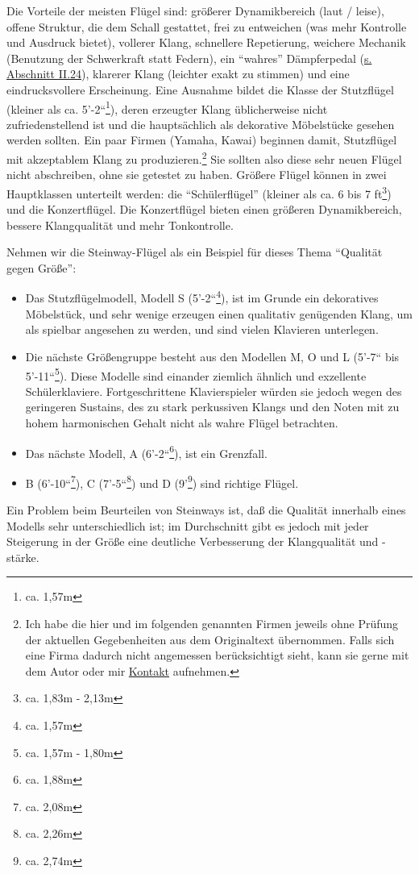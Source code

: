 Die Vorteile der meisten Flügel sind: größerer Dynamikbereich (laut / leise), offene Struktur, die dem Schall gestattet, frei zu entweichen (was mehr Kontrolle und Ausdruck bietet), vollerer Klang, schnellere Repetierung, weichere Mechanik (Benutzung der Schwerkraft statt Federn), ein \enquote{wahres} Dämpferpedal (\hyperref[c1ii24]{s. Abschnitt II.24}), klarerer Klang (leichter exakt zu stimmen) und eine eindrucksvollere Erscheinung.
Eine Ausnahme bildet die Klasse der Stutzflügel (kleiner als ca. 5'-2``\footnote{ca. 1,57m}), deren erzeugter Klang üblicherweise nicht zufriedenstellend ist und die hauptsächlich als dekorative Möbelstücke gesehen werden sollten.
Ein paar Firmen (Yamaha, Kawai) beginnen damit, Stutzflügel mit akzeptablem Klang zu produzieren.\footnote{Ich habe die hier und im folgenden genannten Firmen jeweils ohne Prüfung der aktuellen Gegebenheiten aus dem Originaltext übernommen.
Falls sich eine Firma dadurch nicht angemessen berücksichtigt sieht, kann sie gerne mit dem Autor oder mir \hyperref[kontakt]{Kontakt} aufnehmen.}
Sie sollten also diese sehr neuen Flügel nicht abschreiben, ohne sie getestet zu haben.
Größere Flügel können in zwei Hauptklassen unterteilt werden: die \enquote{Schülerflügel}  (kleiner als ca. 6 bis 7 ft\footnote{ca. 1,83m - 2,13m}) und die Konzertflügel.
Die Konzertflügel bieten einen größeren Dynamikbereich, bessere Klangqualität und mehr Tonkontrolle.

Nehmen wir die Steinway-Flügel als ein Beispiel für dieses Thema \enquote{Qualität gegen Größe}:

\begin{itemize} 
\item Das Stutzflügelmodell, Modell S (5'-2``\footnote{ca. 1,57m}), ist im Grunde ein dekoratives Möbelstück, und sehr wenige erzeugen einen qualitativ genügenden Klang, um als spielbar angesehen zu werden, und sind vielen Klavieren unterlegen.
\item Die nächste Größengruppe besteht aus den Modellen M, O und L (5'-7`` bis 5'-11``\footnote{ca. 1,57m - 1,80m}).
Diese Modelle sind einander ziemlich ähnlich und exzellente Schülerklaviere.
Fortgeschrittene Klavierspieler würden sie jedoch wegen des geringeren Sustains, des zu stark perkussiven Klangs und den Noten mit zu hohem harmonischen Gehalt nicht als wahre Flügel betrachten.
\item Das nächste Modell, A (6'-2``\footnote{ca. 1,88m}), ist ein Grenzfall.
\item B (6'-10``\footnote{ca. 2,08m}), C (7'-5``\footnote{ca. 2,26m}) und D (9'\footnote{ca. 2,74m}) sind richtige Flügel.
 \end{itemize}
Ein Problem beim Beurteilen von Steinways ist, daß die Qualität innerhalb eines Modells sehr unterschiedlich ist; im Durchschnitt gibt es jedoch mit jeder Steigerung in der Größe eine deutliche Verbesserung der Klangqualität und -stärke.

